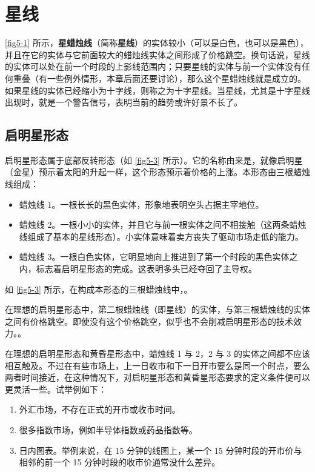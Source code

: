 \chapter{星线\label{ch05}}
\autoref{fig5-1} 所示，\textbf{星蜡烛线}（简称\textbf{星线}）的实体较小（可以是白色，也可以是黑色），并且在它的实体与它前面较大的蜡烛线实体之间形成了价格跳空。换句话说，星线的实体可以处在前一个时段的上影线范围内；只要星线的实体与前一个实体没有任何重叠（有一些例外情形，本章后面还要讨论），那么这个星蜡烛线就是成立的。如果星线的实体已经缩小为十字线，则称之为十字星线。当星线，尤其是十字星线出现时，就是一个警告信号，表明当前的趋势或许好景不长了。

\section{启明星形态}
启明星形态属于底部反转形态（如 \autoref{fig5-3} 所示）。它的名称由来是，就像启明星（金星）预示着太阳的升起一样，这个形态预示着价格的上涨。本形态由三根蜡烛线组成：
\begin{itemize}
    \item 蜡烛线 1。一根长长的黑色实体，形象地表明空头占据主宰地位。
    \item 蜡烛线 2。一根小小的实体，并且它与前一根实体之间不相接触（这两条蜡烛线组成了基本的星线形态）。小实体意味着卖方丧失了驱动市场走低的能力。
    \item 蜡烛线 3。一根白色实体，它明显地向上推进到了第一个时段的黑色实体之内，标志着启明星形态的完成。这表明多头已经夺回了主导权。
\end{itemize}


如 \autoref{fig5-3} 所示，在构成本形态的三根蜡烛线中，。

在理想的启明星形态中，第二根蜡烛线（即星线）的实体，与第三根蜡烛线的实体之间有价格跳空。即使没有这个价格跳空，似乎也不会削减启明星形态的技术效力。。

在理想的启明星形态和黄昏星形态中，蜡烛线 1 与 2，2 与 3 的实体之间都不应该相互触及。不过在有些市场上，上一日收市和下一日开市要么是同一个时点，要么两者时间接近，在这种情况下，对启明星形态和黄昏星形态要求的定义条件便可以更灵活一些。试举例如下：
\begin{enumerate}
    \item 外汇市场，不存在正式的开市或收市时间。
    \item 很多指数市场，例如半导体指数或药品指数等。
    \item 日内图表。举例来说，在 15 分钟的线图上，某一个 15 分钟时段的开市价与相邻的前一个 15 分钟时段的收市价通常没什么差异。
\end{enumerate}
